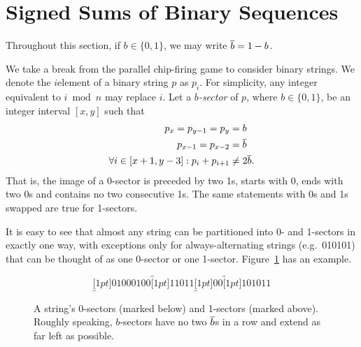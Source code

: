 \section{Signed Sums of Binary Sequences}\label{binSeq}
Throughout this section, if $b \in \{0,1\}$, we may write $\overline{b} = 1-b$.

We take a break from the parallel chip-firing game to consider  binary
strings. We denote the $i$\xth element of a binary string $p$ as
$p_i$. For simplicity, any integer equivalent to $i \bmod n$ may replace
$i$. Let a \emph{$b$-sector} of $p$, where $b \in \{0,1\}$, be an integer
interval $[x,y]$ such that
\begin{align*}
  p_x = p_{y-1} = p_y &= b \\
  p_{x-1} = p_{x-2} &= \overline{b} \\
  \forall i \in [x+1, y-3]: p_i + p_{i+1} &\neq 2\overline{b}.
\end{align*}
That is, the image of a 0-sector is preceded by two 1s, starts with 0, ends
with two 0s and contains no two consecutive 1s. The same statements with 0s and
1s swapped are true for 1-sectors.

It is easy to see that almost any string can be partitioned into 0- and
1-sectors in exactly one way, with exceptions only for always-alternating
strings (e.g.\ 010101) that can be thought of as one 0-sector or one
1-sector. Figure~\ref{sectorEx} has an example.

\begin{figure}
  \[
    \underbracket[1pt]{01000100}\overbracket[1pt]{11011}\underbracket[1pt]{00}
    \overbracket[1pt]{101011}
  \]
  \caption{A string's 0-sectors (marked below) and 1-sectors (marked
    above). Roughly speaking, $b$-sectors have no two $\overline{b}$s in a row and
    extend as far left as possible.}
  \label{sectorEx}
\end{figure}

